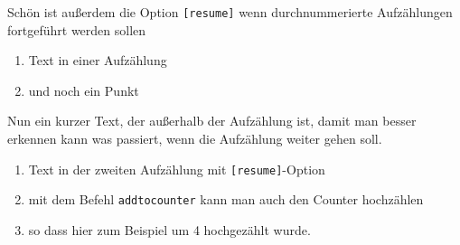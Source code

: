 Schön ist außerdem die Option \texttt{[resume]} wenn durchnummerierte Aufzählungen fortgeführt werden sollen
\begin{enumerate}
\item Text in einer Aufzählung
\item und noch ein Punkt
\end{enumerate}
%
Nun ein kurzer Text, der außerhalb der Aufzählung ist, damit man besser erkennen kann was passiert, wenn die Aufzählung weiter gehen soll.
%
\begin{enumerate}[resume]
\item Text in der zweiten Aufzählung mit \texttt{[resume]}-Option
\item mit dem Befehl \texttt{addtocounter} kann man auch den Counter hochzählen
\addtocounter{enumi}{4}
\item so dass hier zum Beispiel um 4 hochgezählt wurde.
\end{enumerate}

